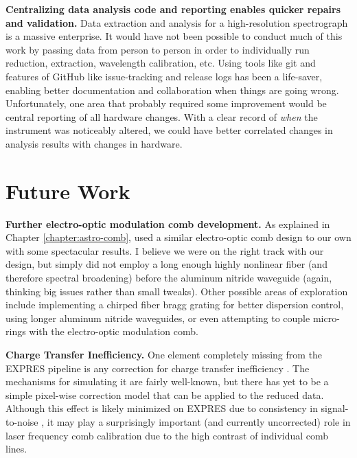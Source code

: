 \textbf{Centralizing data analysis code and reporting enables quicker repairs and validation.} Data extraction and analysis for a high-resolution spectrograph is a massive enterprise. It would have not been possible to conduct much of this work by passing data from person to person in order to individually run reduction, extraction, wavelength calibration, etc. Using tools like git and features of GitHub like issue-tracking and release logs has been a life-saver, enabling better documentation and collaboration when things are going wrong. Unfortunately, one area that probably required some improvement would be central reporting of all hardware changes. With a clear record of \textit{when} the instrument was noticeably altered, we could have better correlated changes in analysis results with changes in hardware.

\section{Future Work} \label{conclusion:future}

\textbf{Further electro-optic modulation comb development.} As explained in Chapter \ref{chapter:astro-comb}, \citet{obrzud_visible_2019} used a similar electro-optic comb design to our own with some spectacular results. I believe we were on the right track with our design, but simply did not employ a long enough highly nonlinear fiber (and therefore spectral broadening) before the aluminum nitride waveguide (again, thinking big issues rather than small tweaks). Other possible areas of exploration include implementing a chirped fiber bragg grating for better dispersion control, using longer aluminum nitride waveguides, or even attempting to couple micro-rings with the electro-optic modulation comb.

\textbf{Charge Transfer Inefficiency.} One element completely missing from the EXPRES pipeline is any correction for charge transfer inefficiency \citep{goudfrooij_empirical_2006, bouchy_charge_2009, blake_impact_2017}. The mechanisms for simulating it are fairly well-known, but there has yet to be a simple pixel-wise correction model that can be applied to the reduced data. Although this effect is likely minimized on EXPRES due to consistency in signal-to-noise \citep{blackman_performance_2020}, it may play a surprisingly important (and currently uncorrected) role in laser frequency comb calibration due to the high contrast of individual comb lines.

